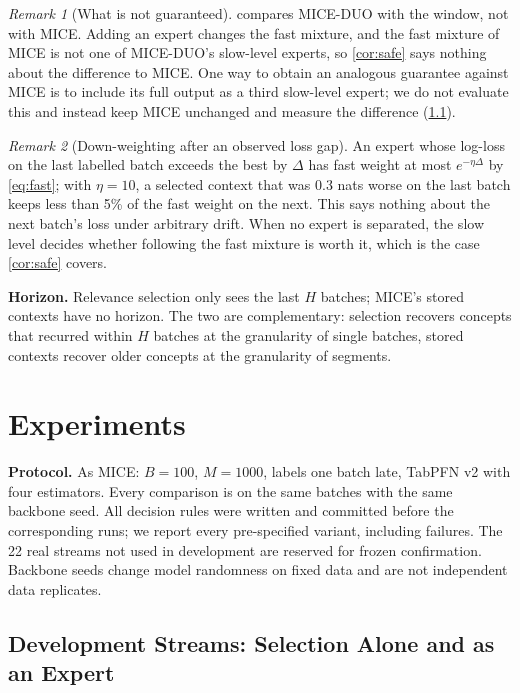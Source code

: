 \documentclass{article}
\theoremstyle{plain}
\theoremstyle{definition}
\theoremstyle{remark}
\newtheorem{remark}{Remark}
\newcommand{\mice}{\textsc{MICE}}
\newcommand{\method}{\textsc{MICE-DUO}}
\begin{document}
\begin{remark}[What is not guaranteed]
 compares \method{} with the window, not with \mice{}. Adding an expert changes the fast mixture, and
the fast mixture of \mice{} is not one of \method{}'s slow-level experts, so \cref{cor:safe} says nothing about the difference to \mice{}. One way to obtain an analogous guarantee
against \mice{} is to include its full output as a third slow-level expert; we do not evaluate this and instead keep
\mice{} unchanged and measure the difference (\cref{sec:exp-dev}).
\end{remark}

\begin{remark}[Down-weighting after an observed loss gap]
An expert whose log-loss on the last labelled batch exceeds the best by $\Delta$ has fast weight at most
$e^{-\eta\Delta}$ by \eqref{eq:fast}; with $\eta=10$, a selected context that was 0.3 nats worse on the last batch
keeps less than 5\% of the fast weight on the next. This says nothing about the next batch's loss under arbitrary
drift. When no expert is separated, the slow level decides whether following the fast mixture is worth
it, which is the case \cref{cor:safe} covers.
\end{remark}

\textbf{Horizon.} Relevance selection only sees the last $H$ batches; \mice{}'s stored contexts have no horizon. The
two are complementary: selection recovers concepts that recurred within $H$ batches at the granularity of single
batches, stored contexts recover older concepts at the granularity of segments.

\section{Experiments}
\label{sec:exp}

\textbf{Protocol.} As \mice{}: $B=100$, $M=1000$, labels one batch late, TabPFN v2 with four estimators. Every
comparison is on the same batches with the same backbone seed. All decision rules were written and committed before
the corresponding runs; we report every pre-specified variant, including failures. The 22 real streams not used in
development are reserved for frozen confirmation. Backbone seeds change model randomness on fixed data and are not independent
data replicates.

\subsection{Development Streams: Selection Alone and as an Expert}
\label{sec:exp-dev}
\end{document}
